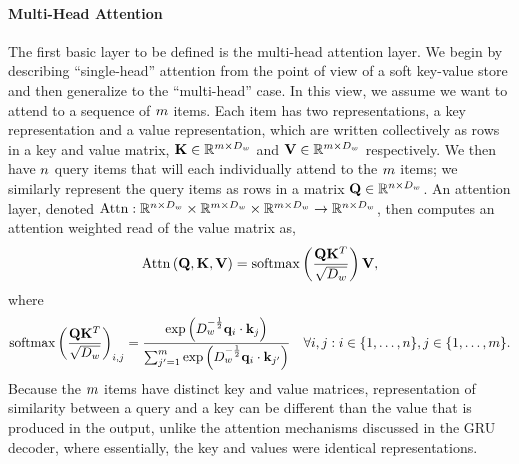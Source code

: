 \paragraph{Multi-Head Attention} The first basic layer to be defined is the 
multi-head attention layer. We begin by describing ``single-head'' attention
from the point of view of a soft key-value store and then generalize to 
the ``multi-head'' case. In this view, we assume we want to attend to 
a sequence of $m$ items. Each item has two representations,
a key representation and a value representation, which are written collectively
as rows in a key and value matrix, $\mathbf{K} \in \mathbb{R}^{m \times D_{w}}$
and $\mathbf{V} \in \mathbb{R}^{m \times D_{w}}$ respectively.
We then  have $n$ query items that will each individually attend to the 
$m$ items; we similarly represent the query items as rows in a matrix
$\mathbf{Q} \in \mathbb{R}^{n \times D_{w}}$. An attention
layer, denoted $\operatorname{Attn} : \mathbb{R}^{n \times D_{w}} \times \mathbb{R}^{m \times D_{w}} \times \mathbb{R}^{m \times D_{w}} \rightarrow \mathbb{R}^{n \times D_{w}}$, then computes an attention weighted read of the value
matrix as,
  \[\operatorname{Attn}\left(\mathbf{Q}, \mathbf{K}, \mathbf{V}\right) = \operatorname*{softmax}\left(\frac{\mathbf{Q} \mathbf{K}^T}{\sqrt{D_{w}}} \right)\mathbf{V}, \]
  where \[\operatorname*{softmax}\left(\frac{\mathbf{Q} \mathbf{K}^T}{\sqrt{D_{w}}} \right)_{i,j} = \frac{\exp\left(D_{w}^{-\frac{1}{2}} \mathbf{q}_i \cdot \mathbf{k}_j\right) }{ \sum_{j^\prime=1}^{m} \exp\left( D_{w}^{-\frac{1}{2}} \mathbf{q}_i \cdot \mathbf{k}_{j^\prime}\right)} \quad \forall i,j : i \in \{1,\ldots,n\}, j \in \{1,\ldots,m\}.\]
  Because the $m$ items have distinct key and value matrices,
  representation of similarity between a query and a key can be different
  than the value that is produced in the output, unlike the attention
  mechanisms discussed in the GRU decoder, where essentially, the key
  and values were identical representations.


